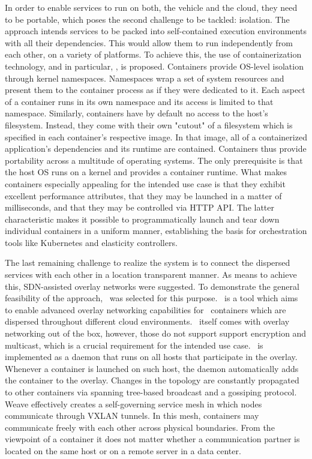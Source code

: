 In order to enable services to run on both, the vehicle and the cloud, they need to be portable, which poses the second challenge to be tackled: isolation. The approach intends services to be packed into self-contained execution environments with all their dependencies. This would allow them to run independently from each other, on a variety of platforms. To achieve this, the use of containerization technology, and in particular, \docker , is proposed. Containers provide OS-level isolation through kernel namespaces. Namespaces wrap a set of system resources and present them to the container process as if they were dedicated to it. Each aspect of a container runs in its own namespace and its access is limited to that namespace. Similarly, containers have by default no access to the host's filesystem. Instead, they come with their own "cutout" of a filesystem which is specified in each container's respective image. In that image, all of a containerized application's dependencies and its runtime are contained. Containers thus provide portability across a multitude of operating systems. The only prerequisite is that the host OS runs on a kernel and provides a container runtime. What makes containers especially appealing for the intended use case is that they exhibit excellent performance attributes, that they may be launched in a matter of milliseconds, and that they may be controlled via HTTP API. The latter characteristic makes it possible to programmatically launch and tear down individual containers in a uniform manner, establishing the basis for orchestration tools like Kubernetes and elasticity controllers.

The last remaining challenge to realize the system is to connect the dispersed services with each other in a location transparent manner. As means to achieve this, SDN-assisted overlay networks were suggested. To demonstrate the general feasibility of the approach, \wnet\ was selected for this purpose. \wnet\ is a tool which aims to enable advanced overlay networking capabilities for \docker\ containers which are dispersed throughout different cloud environments. \docker\ itself comes with overlay networking out of the box, however, those do not support support encryption and multicast, which is a crucial requirement for the intended use case. \weave\ is implemented as a daemon that runs on all hosts that participate in the overlay. Whenever a container is launched on such host, the daemon automatically adds the container to the overlay. Changes in the topology are constantly propagated to other containers via spanning tree-based broadcast and a gossiping protocol. Weave effectively creates a self-governing service mesh in which nodes communicate through VXLAN tunnels. In this mesh, containers may communicate freely with each other across physical boundaries. From the viewpoint of a container it does not matter whether a communication partner is located on the same host or on a remote server in a data center. 

